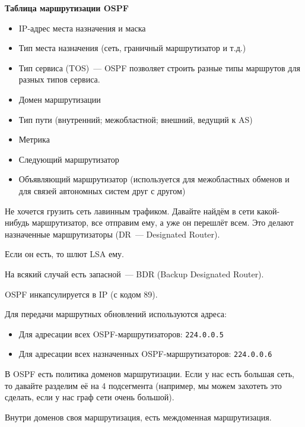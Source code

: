 {\bf Таблица маршрутизации OSPF}
\begin{itemize}
    \item IP-адрес места назначения и маска
    \item Тип места назначения (сеть, граничный маршрутизатор и т.д.)
    \item Тип сервиса (TOS)~--- OSPF позволяет строить разные типы маршрутов для разных типов сервиса. 
    \item Домен маршрутизации
    \item Тип пути (внутренний; межобластной; внешний, ведущий к AS)
    \item Метрика
    \item Следующий маршрутизатор
    \item Объявляющий маршрутизатор (используется для межобластных обменов и для связей автономных систем друг с другом)
\end{itemize}

Не хочется грузить сеть лавинным трафиком. Давайте найдём в сети какой-нибудь маршрутизатор, все отправим ему, а уже он перешлёт всем. Это делают назначенные маршрутизаторы (DR~--- Designated Router).

Если он есть, то шлют LSA ему.

На всякий случай есть запасной~--- BDR (Backup Designated Router).

OSPF инкапсулируется в IP (с кодом 89).

Для передачи маршрутных обновлений используются адреса:
\begin{itemize}
    \item Для адресации всех OSPF-маршрутизаторов: {\tt 224.0.0.5}
    \item Для адресации всех назначенных OSPF-маршрутизаторов: {\tt 224.0.0.6}
\end{itemize}

В OSPF есть политика доменов маршрутизации. Если у нас есть большая сеть, то давайте разделим её на 4 подсегмента (например, мы можем захотеть это сделать, если у нас граф сети очень большой).

Внутри доменов своя маршрутизация, есть междоменная маршрутизация. 

